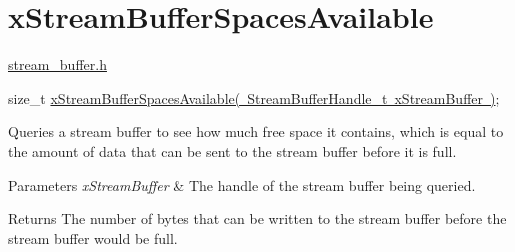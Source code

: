 \hypertarget{group__x_stream_buffer_spaces_available}{}\section{x\+Stream\+Buffer\+Spaces\+Available}
\label{group__x_stream_buffer_spaces_available}
\mbox{\hyperlink{stream__buffer_8h}{stream\+\_\+buffer.\+h}}


\begin{DoxyPre}
size\_t \mbox{\hyperlink{stream__buffer_8h_a9a78e0206cb1dc343c329f9db579208d}{xStreamBufferSpacesAvailable( StreamBufferHandle\_t xStreamBuffer )}};
\end{DoxyPre}


Queries a stream buffer to see how much free space it contains, which is equal to the amount of data that can be sent to the stream buffer before it is full.


\begin{DoxyParams}{Parameters}
{\em x\+Stream\+Buffer} & The handle of the stream buffer being queried.\\
\hline
\end{DoxyParams}
\begin{DoxyReturn}{Returns}
The number of bytes that can be written to the stream buffer before the stream buffer would be full. 
\end{DoxyReturn}

